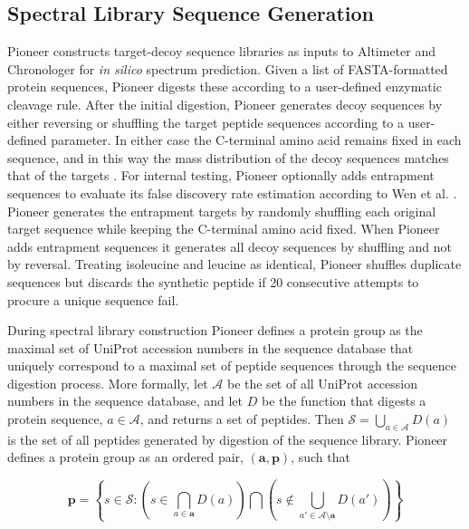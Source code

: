 \documentclass[pdflatex,sn-nature]{sn-jnl}
\begin{document}
\subsection{Spectral Library Sequence Generation}\label{subsec:spectral-library-sequence-generation}
Pioneer constructs target-decoy sequence libraries as inputs to Altimeter and Chronologer for \textit{in silico} spectrum prediction. Given a list of FASTA-formatted protein sequences, Pioneer digests these according to a user-defined enzymatic cleavage rule. After the initial digestion, Pioneer generates decoy sequences by either reversing or shuffling the target peptide sequences according to a user-defined parameter. In either case the C-terminal amino acid remains fixed in each sequence, and in this way the mass distribution of the decoy sequences matches that of the targets \cite{Freestone2023-ef}. For internal testing, Pioneer optionally adds entrapment sequences to evaluate its false discovery rate estimation according to Wen et al. \cite{Wen2024-jv}. Pioneer generates the entrapment targets by randomly shuffling each original target sequence while keeping the C-terminal amino acid fixed. When Pioneer adds entrapment sequences it generates all decoy sequences by shuffling and not by reversal. Treating isoleucine and leucine as identical, Pioneer shuffles duplicate sequences but discards the synthetic peptide if 20 consecutive attempts to procure a unique sequence fail.  

During spectral library construction Pioneer defines a protein group as the maximal set of UniProt accession numbers in the sequence database that uniquely correspond to a maximal set of peptide sequences through the sequence digestion process. More formally, let $\mathcal{A}$ be the set of all UniProt accession numbers in the sequence database, and let $D$ be the function that digests a protein sequence, $a \in \mathcal{A}$, and returns a set of peptides. Then $\mathcal{S} = {\bigcup_{a \in \mathcal{A}} D(a)}$ is the set of all peptides generated by digestion of the sequence library. Pioneer defines a protein group as an ordered pair, $(\mathbf{a}, \mathbf{p})$, such that

\begin{equation}
\mathbf{p} = \left\{s 
\in \mathcal{S} : \left( s \in \bigcap_{a \in \mathbf{a}} D(a)\right) \bigcap \left(s \notin \bigcup_{a' \in \mathcal{A}\setminus\mathbf{a}} D(a') \right)\right\}
\end{equation}
\end{document}
